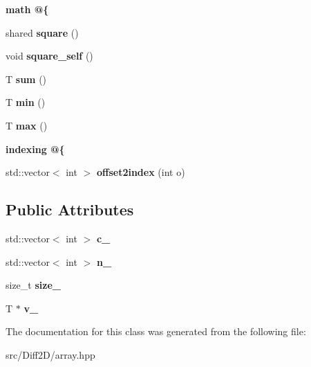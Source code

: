 \begin{Indent}{\bf math @\{}\par
\begin{DoxyCompactItemize}
\item 
\hypertarget{class____array_a566abb01d09bf563edf9f7f761b4317d}{shared {\bfseries square} ()}\label{class____array_a566abb01d09bf563edf9f7f761b4317d}

\item 
\hypertarget{class____array_ad6e7fc66551df684d4337929b8636446}{void {\bfseries square\-\_\-self} ()}\label{class____array_ad6e7fc66551df684d4337929b8636446}

\item 
\hypertarget{class____array_acd4f2a6476211e9d948a0d8ae884a3cc}{T {\bfseries sum} ()}\label{class____array_acd4f2a6476211e9d948a0d8ae884a3cc}

\item 
\hypertarget{class____array_a2edfd07e97b1fdca31ad463f2ef9962f}{T {\bfseries min} ()}\label{class____array_a2edfd07e97b1fdca31ad463f2ef9962f}

\item 
\hypertarget{class____array_a9489124f312f9409853b9bf29b6dd585}{T {\bfseries max} ()}\label{class____array_a9489124f312f9409853b9bf29b6dd585}

\end{DoxyCompactItemize}
\end{Indent}
\begin{Indent}{\bf indexing @\{}\par
\begin{DoxyCompactItemize}
\item 
\hypertarget{class____array_ab5755f3be1a48c4c62a12adc512dac16}{std\-::vector$<$ int $>$ {\bfseries offset2index} (int o)}\label{class____array_ab5755f3be1a48c4c62a12adc512dac16}

\end{DoxyCompactItemize}
\end{Indent}
\subsection*{Public Attributes}
\begin{DoxyCompactItemize}
\item 
\hypertarget{class____array_aaca68729c0b849ed2f2b5813d97406b4}{std\-::vector$<$ int $>$ {\bfseries c\-\_\-}}\label{class____array_aaca68729c0b849ed2f2b5813d97406b4}

\item 
\hypertarget{class____array_aa23a824622889b5edab8fcd74d9d2ca8}{std\-::vector$<$ int $>$ {\bfseries n\-\_\-}}\label{class____array_aa23a824622889b5edab8fcd74d9d2ca8}

\item 
\hypertarget{class____array_a9e84ea9904c281c73d38730bf1c63c6f}{size\-\_\-t {\bfseries size\-\_\-}}\label{class____array_a9e84ea9904c281c73d38730bf1c63c6f}

\item 
\hypertarget{class____array_acd1bdf7fd0d7c1d9888ec5ab746e4472}{T $\ast$ {\bfseries v\-\_\-}}\label{class____array_acd1bdf7fd0d7c1d9888ec5ab746e4472}

\end{DoxyCompactItemize}


The documentation for this class was generated from the following file\-:\begin{DoxyCompactItemize}
\item 
src/\-Diff2\-D/array.\-hpp\end{DoxyCompactItemize}
